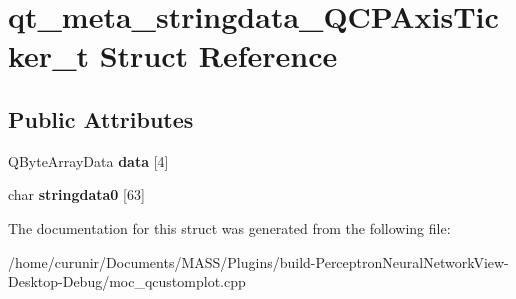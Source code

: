 \hypertarget{structqt__meta__stringdata___q_c_p_axis_ticker__t}{}\section{qt\+\_\+meta\+\_\+stringdata\+\_\+\+Q\+C\+P\+Axis\+Ticker\+\_\+t Struct Reference}
\label{structqt__meta__stringdata___q_c_p_axis_ticker__t}
\subsection*{Public Attributes}
\begin{DoxyCompactItemize}
\item 
Q\+Byte\+Array\+Data {\bfseries data} \mbox{[}4\mbox{]}\hypertarget{structqt__meta__stringdata___q_c_p_axis_ticker__t_a0e5e6cc358157945592776d87e7d14b4}{}\label{structqt__meta__stringdata___q_c_p_axis_ticker__t_a0e5e6cc358157945592776d87e7d14b4}

\item 
char {\bfseries stringdata0} \mbox{[}63\mbox{]}\hypertarget{structqt__meta__stringdata___q_c_p_axis_ticker__t_a8600a85cebf0ead1c96536e854070e8b}{}\label{structqt__meta__stringdata___q_c_p_axis_ticker__t_a8600a85cebf0ead1c96536e854070e8b}

\end{DoxyCompactItemize}


The documentation for this struct was generated from the following file\+:\begin{DoxyCompactItemize}
\item 
/home/curunir/\+Documents/\+M\+A\+S\+S/\+Plugins/build-\/\+Perceptron\+Neural\+Network\+View-\/\+Desktop-\/\+Debug/moc\+\_\+qcustomplot.\+cpp\end{DoxyCompactItemize}
